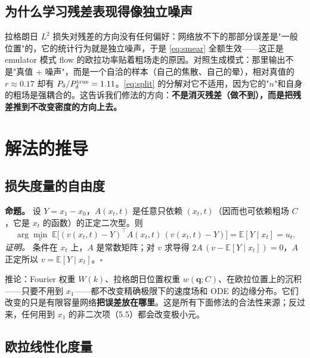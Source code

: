\documentclass[11pt,UTF8,fontset=none]{ctexart}
\newcommand{\q}{\mathbf{q}}
\newcommand{\E}{\mathbb{E}}
\newcommand{\Pd}{P_\delta}
\begin{document}
\subsection{为什么学习残差表现得像独立噪声}
拉格朗日 $L^2$ 损失对残差的方向没有任何偏好：网络放不下的那部分误差是"一般位置"的，它的统计行为就是独立噪声，于是 \eqref{eq:smear} 全额生效——这正是 emulator 模式 flow 的欧拉功率贴着粗场走的原因。对照生成模式：那里输出不是"真值 + 噪声"，而是一个自洽的样本（自己的焦散、自己的晕），相对真值的 $r\approx0.17$ 却有 $\Pd/\Pd^{\rm true}=1.11$。\eqref{eq:split} 的分解对它不适用，因为它的"$n$"和自身的粗场是强耦合的。这告诉我们修法的方向：\textbf{不是消灭残差（做不到），而是把残差推到不改变密度的方向上去。}

\section{解法的推导}

\subsection{损失度量的自由度}

\textbf{命题。} 设 $Y=x_1-x_0$，$A(x_t,t)$ 是任意只依赖 $(x_t,t)$（因而也可依赖粗场 $C$，它是 $x_t$ 的函数）的正定二次型。则
\begin{equation}
\arg\min_v\;\E\big[(v(x_t,t)-Y)^{\!\top}A(x_t,t)\,(v(x_t,t)-Y)\big]=\E[Y\mid x_t]=u_t .
\end{equation}
\emph{证明。} 条件在 $x_t$ 上，$A$ 是常数矩阵；对 $v$ 求导得 $2A\,(v-\E[Y\mid x_t])=0$，$A$ 正定所以 $v=\E[Y\mid x_t]$。$\square$

推论：Fourier 权重 $W(k)$、拉格朗日位置权重 $w(\q;C)$、在欧拉位置上的沉积——只要不用到 $x_1$——都不改变精确极限下的速度场和 ODE 的边缘分布。它们改变的只是有限容量网络\textbf{把误差放在哪里}。这是所有下面修法的合法性来源；反过来，任何用到 $x_1$ 的非二次项（5.5）都会改变极小元。

\subsection{欧拉线性化度量}
\end{document}
